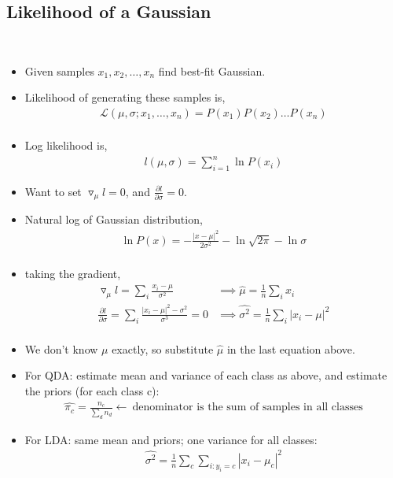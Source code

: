 \documentclass[10pt]{article}
\begin{document}
	\subsection*{Likelihood of a Gaussian}
		\
		\begin{itemize}
			\item Given samples $x_{1}, x_{2}, \dots, x_{n}$ find best-fit Gaussian.
			\item Likelihood of generating these samples is,
				\begin{align*}
					\mathcal{L}(\mu, \sigma;x_{1}, \dots, x_{n}) = P(x_{1})P(x_{2}) \dots P(x_{n})\\
				\end{align*}
			\item Log likelihood is,
				\begin{align*}
					l(\mu, \sigma) = \sum_{i=1}^{n} \ln P(x_{i})
				\end{align*}
			\item Want to set $\triangledown_{\mu} l = 0$, and  $\frac{\partial l}{\partial \sigma} = 0$.
			\item Natural log of Gaussian distribution,
				\begin{align*}
					\ln P(x) = -\frac{|x-\mu|^{2}}{2\sigma^{2}} - \ln \sqrt{2\pi} - \ln \sigma\\
				\end{align*}
			\item taking the gradient,
				\begin{align*}
					\triangledown_{\mu}l = \sum_{i} \frac{x_{i}-\mu}{\sigma^{2}} &\implies \hat{\mu} = \frac{1}{n} \sum_{i} x_{i}\\
					\frac{\partial l}{\partial \sigma} = \sum_{i} \frac{|x_{i} - \mu|^{2} - \sigma^{2}}{\sigma^{3}} = 0 &\implies \hat{\sigma^{2}} = \frac{1}{n} \sum_{i} |x_{i} - \mu|^{2}\\
				\end{align*}
			\item We don't know $\mu$ exactly, so substitute $\hat{\mu}$ in the last equation above.
			\item For QDA: estimate mean and variance of each class as above, and estimate the priors (for each class c):
				\begin{align*}
					\hat{\pi_{c}} = \frac{n_{c}}{\sum_{d} n_{d}} \leftarrow \ \text{denominator is the sum of samples in all classes}
				\end{align*}
			\item For LDA: same mean and priors; one variance for all classes:
				\begin{align*}
					\hat{\sigma^{2}} = \frac{1}{n} \sum_{c} \sum_{i:y_{i}=c} |x_{i} - \mu_{c}|^{2}
				\end{align*}
		\end{itemize}
\end{document}

